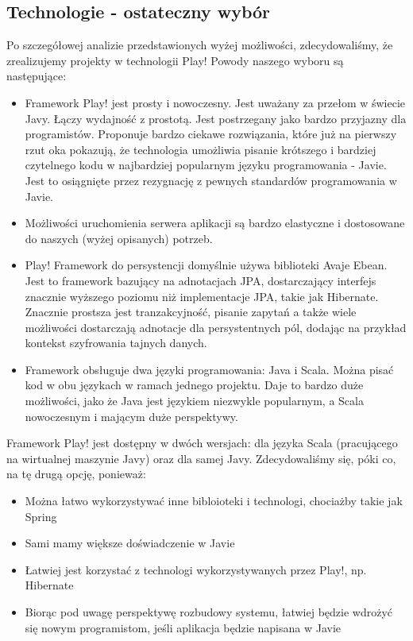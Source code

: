 \documentclass[a4paper,12pt,notitlepage]{mwrep}
\begin{document}
\subsection{Technologie - ostateczny wybór}
Po szczegółowej analizie przedstawionych wyżej możliwości, zdecydowaliśmy,
że zrealizujemy projekty w technologii Play! Powody naszego wyboru są następujące:
\begin{itemize}
	\item	Framework Play! jest prosty i nowoczesny. Jest uważany za przełom w świecie Javy.
			Łączy wydajność z prostotą. Jest postrzegany jako bardzo przyjazny dla programistów.
			Proponuje bardzo ciekawe rozwiązania, które już na pierwszy rzut oka pokazują,
			że technologia umożliwia pisanie krótszego i bardziej czytelnego kodu w najbardziej
			popularnym języku programowania - Javie. Jest to osiągnięte przez rezygnację
			z pewnych standardów programowania w Javie.
	\item	Możliwości uruchomienia serwera aplikacji są bardzo elastyczne i dostosowane
			do naszych (wyżej opisanych) potrzeb. 
	\item	Play! Framework do persystencji domyślnie używa biblioteki Avaje Ebean. Jest to framework 
			bazujący na adnotacjach JPA, dostarczający interfejs znacznie wyższego poziomu niż 
			implementacje JPA, takie jak Hibernate. Znacznie prostsza jest tranzakcyjność, pisanie 
			zapytań a także wiele możliwości dostarczają adnotacje dla persystentnych pól, dodając 
			na przykład kontekst szyfrowania tajnych danych.
	\item	Framework obsługuje dwa języki programowania: Java i Scala. Można pisać kod w obu językach w ramach 
			jednego projektu. Daje to bardzo duże możliwości, jako że Java jest językiem niezwykle 
			popularnym, a Scala nowoczesnym i mającym duże perspektywy. 
 
\end{itemize}
Framework Play! jest dostępny w dwóch wersjach: dla języka Scala (pracującego na wirtualnej
maszynie Javy) oraz dla samej Javy. Zdecydowaliśmy się, póki co, na tę drugą opcję, ponieważ:
\begin{itemize}
	\item	Można łatwo wykorzystywać inne bibloioteki i technologi, chociażby takie jak Spring
	\item	Sami mamy większe doświadczenie w Javie
	\item	Łatwiej jest korzystać z technologi wykorzystywanych przez Play!, np. Hibernate
	\item	Biorąc pod uwagę perspektywę rozbudowy systemu, łatwiej będzie wdrożyć się nowym programistom,
			jeśli aplikacja będzie napisana w Javie
\end{itemize}
\end{document}
